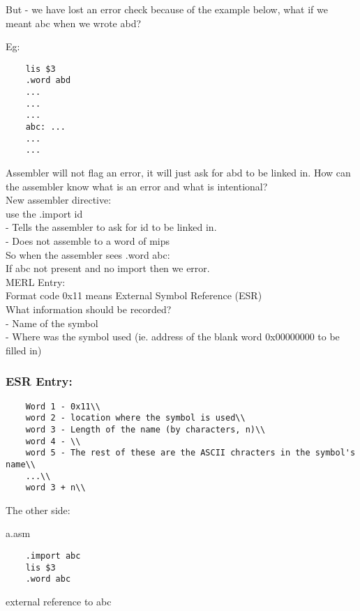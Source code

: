 \documentclass[12pt]{article}
\begin{document}
	But - we have lost an error check because of the example below, what if we meant abc when we wrote abd?
	
	Eg:
	\begin{verbatim}
	lis $3
	.word abd
	...
	...
	...
	abc: ...
	...
	...
	\end{verbatim}
	
	Assembler will not flag an error, it will just ask for abd to be linked in. How can the assembler know what is an error and what is intentional?\\
	
	New assembler directive:\\
	use the .import id\\
	- Tells the assembler to ask for id to be linked in.\\
	- Does not assemble to a word of mips\\
	
	So when the assembler sees .word abc:\\
	If abc not present and no import then we error.\\
	
	MERL Entry:\\
	Format code 0x11 means External Symbol Reference (ESR)\\
	
	What information should be recorded?\\
	- Name of the symbol\\
	- Where was the symbol used (ie. address of the blank word 0x00000000 to be filled in)\\
	
	\subsubsection{ESR Entry:}
	\begin{verbatim}
	Word 1 - 0x11\\
	word 2 - location where the symbol is used\\
	word 3 - Length of the name (by characters, n)\\
	word 4 - \\
	word 5 - The rest of these are the ASCII chracters in the symbol's name\\
	...\\
	word 3 + n\\
	\end{verbatim}
	The other side:
	
	a.asm
	\begin{verbatim}
	.import abc
	lis $3
	.word abc
	\end{verbatim}
	external reference to abc\\
	
\end{document}
